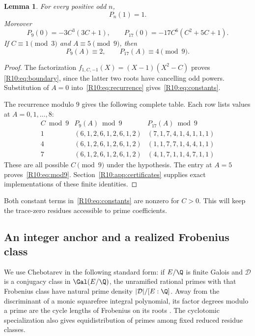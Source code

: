 \documentclass[11pt,a4paper]{article}
\newtheorem{lemma}[theorem]{Lemma}\newtheorem{proposition}[theorem]{Proposition}
\theoremstyle{definition}\newtheorem{definition}[theorem]{Definition}
\theoremstyle{remark}\newtheorem{remark}[theorem]{Remark}
\begin{document}
\begin{lemma}\label{R10:lem:identities}
For every positive odd $n$,
\begin{equation}\label{R10:eq:boundary}
                             P_n(1)=1.
\end{equation}
Moreover
\begin{equation}\label{R10:eq:constants}
 P_9(0)=-3C^3(3C+1),\qquad
 P_{17}(0)=-17C^6(C^2+5C+1).
\end{equation}
If $C\equiv1\pmod3$ and $A\equiv5\pmod9$, then
\begin{equation}\label{R10:eq:mod9}
                             P_9(A)\equiv2,\qquad
                             P_{17}(A)\equiv4\pmod9.
\end{equation}
\end{lemma}
\begin{proof}
The factorization $f_{1,C,-1}(X)=(X-1)(X^2-C)$ proves
\eqref{R10:eq:boundary}, since the latter two roots have cancelling odd powers.
Substitution of $A=0$ into~\eqref{R10:eq:recurrence} gives~\eqref{R10:eq:constants}.

The recurrence modulo $9$ gives the following complete table.
Each row lists values at $A=0,1,\ldots,8$:
\[
\begin{array}{c|c|c}
 C\bmod9&P_9(A)\bmod9&P_{17}(A)\bmod9\\\hline
 1&(6,1,2,6,1,2,6,1,2)&(7,1,7,4,1,4,1,1,1)\\
 4&(6,1,2,6,1,2,6,1,2)&(1,1,7,7,1,4,4,1,1)\\
 7&(6,1,2,6,1,2,6,1,2)&(4,1,7,1,1,4,7,1,1)
\end{array}
\]
These are all possible $C\pmod9$ under the hypothesis.
The entry at $A=5$ proves~\eqref{R10:eq:mod9}.
Section~\ref{R10:app:certificates} supplies exact implementations of these
finite identities.
\end{proof}

Both constant terms in~\eqref{R10:eq:constants} are nonzero for $C>0$.
This will keep the trace-zero residues accessible to prime coefficients.

\subsection{An integer anchor and a realized Frobenius class}
\label{R10:sec:anchor}

We use Chebotarev in the following standard form: if $E/\Q$ is finite
Galois and $\mathcal D$ is a conjugacy class in $\Gal(E/\Q)$, the
unramified rational primes with that Frobenius class have natural
prime density $|\mathcal D|/[E:\Q]$.
Away from the discriminant of a monic squarefree integral polynomial,
its factor degrees modulo a prime are the cycle lengths of Frobenius
on its roots \cite[Fact~2.1 and Theorem~3.1]{Lenstra}.
The cyclotomic specialization also gives equidistribution of primes
among fixed reduced residue classes.
\end{document}
